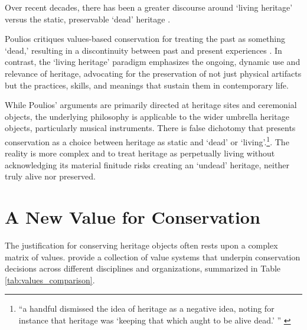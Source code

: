 Over recent decades, there has been a greater discourse around `living heritage' versus the static, preservable `dead' heritage \cite{poulios_moving_2010,smith_uses_2006}. 

Poulios critiques values-based conservation for treating the past as something `dead,' resulting in a discontinuity between past and present experiences \cite{poulios_moving_2010}. In contrast, the `living heritage' paradigm emphasizes the ongoing, dynamic use and relevance of heritage, advocating for the preservation of not just physical artifacts but the practices, skills, and meanings that sustain them in contemporary life.

While Poulios' arguments are primarily directed at heritage sites and ceremonial objects, the underlying philosophy is applicable to the wider umbrella heritage objects, particularly musical instruments. There is false dichotomy that presents conservation as a choice between heritage as static and `dead' or `living'.\footnote{``a handful dismissed the idea of heritage as a negative idea, noting for instance that heritage was `keeping that which aught to be alive dead.' '' \cite{smith_uses_2006}}.
The reality is more complex and to treat heritage as perpetually living without acknowledging its material finitude risks creating an `undead' heritage, neither truly alive nor preserved.

\section{A New Value for Conservation}

The justification for conserving heritage objects often rests upon a complex matrix of values. \textcite{avrami_values_2000} provide a collection of value systems that underpin conservation decisions across different disciplines and organizations, summarized in Table \ref{tab:values_comparison}.

